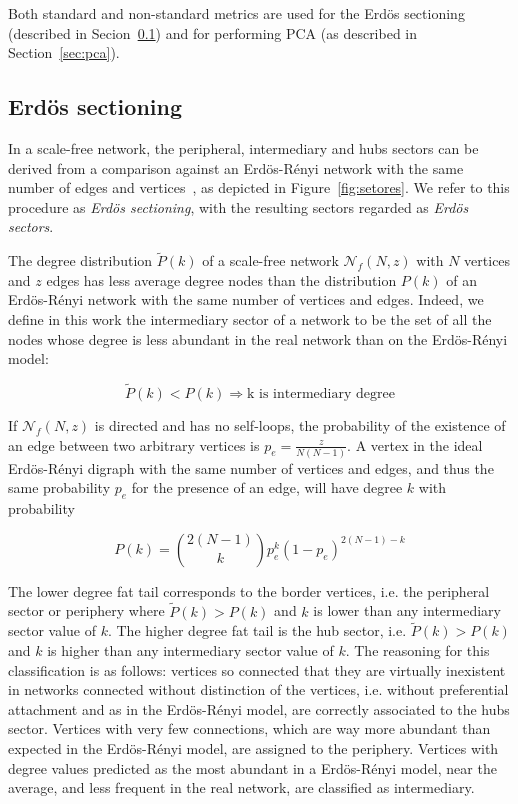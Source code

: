 \documentclass[%
	aip,
	jmp,%
	amsmath,amssymb,
	reprint,%
]{revtex4-1}
\begin{document}
Both standard and non-standard metrics are used for the Erd\"os sectioning (described in Secion~\ref{sectioning}) and for performing PCA (as described in Section~\ref{sec:pca}).


\subsection{Erd\"os sectioning}\label{sectioning}
In a scale-free network, the peripheral, intermediary and hubs sectors can be derived from a comparison against an Erd\"os-R\'enyi network with the same number of edges and vertices~\cite{3setores}, as depicted in Figure~\ref{fig:setores}. We refer to this procedure as \emph{Erd\"os sectioning}, with the resulting sectors regarded as \emph{Erd\"os sectors}.

The degree distribution $\widetilde{P}(k)$ of a
scale-free network $\mathcal{N}_f(N,z)$ with $N$ vertices and $z$ edges has less
average degree nodes than the distribution $P(k)$ of an Erd\"os-R\'enyi
network with the same number of vertices and edges. Indeed, we define in this work the intermediary sector of a network to be the set of all the nodes whose degree is less abundant in the real network than on the Erd\"os-R\'enyi model:

\begin{equation}\label{criterio}
	\widetilde{P}(k)<P(k) \Rightarrow \text{k is intermediary degree}
\end{equation}

If $\mathcal{N}_f(N,z)$ is directed and has no self-loops, the probability of the existence
of an edge between two arbitrary vertices is $p_e=\frac{z}{N(N-1)}$.
A vertex in the ideal Erd\"os-R\'enyi digraph with the same number of vertices and edges, and thus the same probability $p_e$ for the presence of an edge, will have degree $k$ with probability

\begin{equation}
	P(k)=\binom{2(N-1)}{k}p_e^k(1-p_e)^{2(N-1)-k}
\end{equation}

The lower degree fat tail corresponds to the border vertices, i.e. the peripheral sector or periphery where $\widetilde{P}(k)>P(k)$ and $k$ is lower than any intermediary sector value of $k$.
The higher degree fat tail is the hub sector, i.e. $\widetilde{P}(k)>P(k)$ and $k$ is higher than any intermediary sector value of $k$.
The reasoning for this classification is as follows: vertices so connected that they are virtually inexistent in networks connected without distinction of the vertices, i.e. without preferential attachment and as in the Erd\"os-R\'enyi model, are correctly associated to the hubs sector.
Vertices with very few connections, which are way more abundant than expected in the Erd\"os-R\'enyi model, are assigned to the periphery.
Vertices with degree values predicted as the most abundant in a Erd\"os-R\'enyi model,
near the average, and less frequent in the real network, are classified as intermediary.
\end{document}
